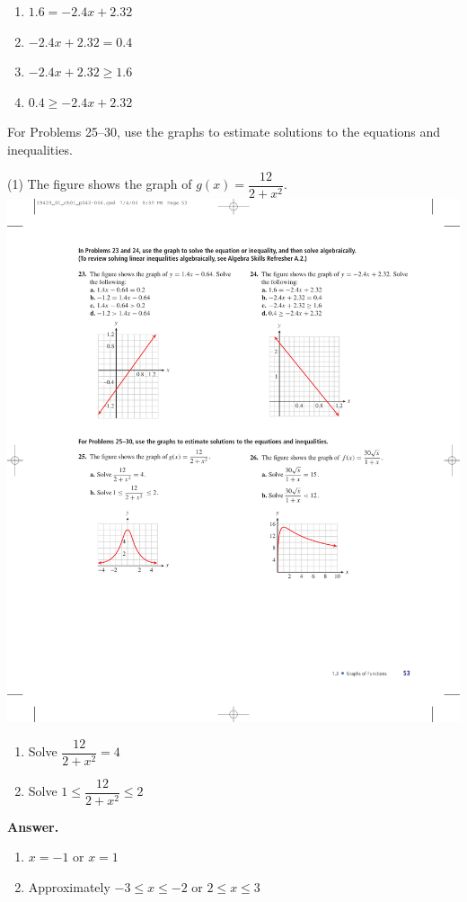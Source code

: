 \documentclass[10pt,]{book}
\theoremstyle{plain}
\theoremstyle{definition}
\theoremstyle{definition}
\theoremstyle{definition}
\theoremstyle{definition}
\numberwithin{equation}{part}
\begin{document}
\begin{exerciselist}
\begin{exercisegroup}
 \leavevmode%
\begin{enumerate}[label=*\alph**]
\item\hypertarget{li-775}{}\(1.6 = -2.4x + 2.32\)%
\item\hypertarget{li-776}{}\(-2.4x + 2.32 = 0.4\)%
\item\hypertarget{li-777}{}\(-2.4x + 2.32\ge 1.6\)%
\item\hypertarget{li-778}{}\(0.4\ge -2.4x + 2.32\)%
\end{enumerate}
%
\end{exercisegroup}
\par\smallskip\noindent
\hypertarget{exercisegroup-20}{}\par\noindent For Problems 25–30, use the graphs to estimate solutions to the equations and inequalities.%
\begin{exercisegroup}(1)
\exercise[25.]\hypertarget{exercise-182}{}The figure shows the graph of \(g(x) = \dfrac{12}{2 + x^2}\). \includegraphics[width=0.4\linewidth]{images/fig-ex-1-3-25}
 \leavevmode%
\begin{enumerate}[label=*\alph**]
\item\hypertarget{li-779}{}Solve \(\dfrac{12}{2 + x^2} = 4\)%
\item\hypertarget{li-780}{}Solve \(1\le \dfrac{12}{2 + x^2} \le 2\)%
\end{enumerate}
%
\par\smallskip
\noindent\textbf{Answer.}\hypertarget{answer-105}{}\quad
\leavevmode%
\begin{enumerate}[label=*\alph**]
\item\hypertarget{li-781}{}\(x=-1\)  or \(x = 1\)%
\item\hypertarget{li-782}{}Approximately \(-3\le x\le -2\)  or \(2\le x\le 3\)%
\end{enumerate}
%

\end{exercisegroup}
\end{exerciselist}
\end{document}
